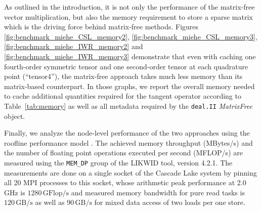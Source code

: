 \documentclass[AMA,STIX1COL]{WileyNJD-v2}
\begin{document}
As outlined in the introduction, it is not only the performance of the matrix-free vector multiplication, but also the memory requirement to store a sparse matrix which is the driving force behind matrix-free methods.
Figures \ref{fig:benchmark_miehe_CSL_memory2}, \ref{fig:benchmark_miehe_CSL_memory3}, \ref{fig:benchmark_miehe_IWR_memory2} and \ref{fig:benchmark_miehe_IWR_memory3}
demonstrate that even with caching one fourth-order symmetric tensor and one second-order tensor at each quadrature point (``tensor4''), the matrix-free approach takes much less memory than its matrix-based counterpart.
In those graphs, we report the overall memory needed to cache additional quantities required for the tangent operator according to Table~\ref{tab:memory}
as well as all metadata required by
the \texttt{deal.II} \textit{MatrixFree} object.

Finally, we analyze the node-level performance of the two approaches using the roofline performance model \cite{Williams2009}.
The achieved memory throughput (MBytes/s) and the number of floating point operations executed per second (MFLOP/s)
are measured using the \texttt{MEM\_DP} group of the LIKWID \cite{likwid} tool, version 4.2.1.
The measurements are done on a single socket of the Cascade Lake system by pinning all 20 MPI processes to this socket,
whose arithmetic peak performance at 2.0 GHz is $1280\, \text{GFlop/s}$ and measured memory bandwidth for pure read tasks is
$120\, \text{GB/s}$ as well as $90\, \text{GB/s}$ for mixed data access of two loads per one store.
\end{document}
